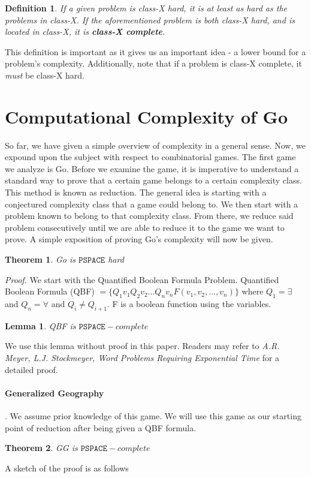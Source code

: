 \documentclass{article}
\newtheorem{theorem}{Theorem}
\newtheorem{lemma}{Lemma}
\newtheorem{definition}{Definition}
\begin{document}
\begin{definition}
If a given problem is class-X hard, it is at least as hard as the problems in class-X.
\newline
If the aforementioned problem is both class-X hard, and is located in class-X, it is \textbf{class-X complete}.
\end{definition}

This definition is important as it gives us an important idea - a lower bound for a problem's complexity. Additionally, note that if a problem is class-X complete, it \emph{must} be class-X hard. 

\section{Computational Complexity of Go}
So far, we have given a simple overview of complexity in a general sense. Now, we expound upon the subject with respect to combinatorial games. 
\newline
\newline
The first game we analyze is Go. Before we examine the game, it is imperative to understand a standard way to prove that a certain game belongs to a certain complexity class. This method is known as reduction. The general idea is starting with a conjectured complexity class that a game could belong to. We then start with a problem known to belong to that complexity class. From there, we reduce said problem consecutively until we are able to reduce it to the game we want to prove. 
\newline
\newline
A simple exposition of proving Go's complexity will now be given.
\begin{theorem}
Go is $\texttt{PSPACE}$ hard
\end{theorem}
\emph{Proof.} We start with the Quantified Boolean Formula Problem. Quantified Boolean Formula (QBF) $ = \{Q_1v_1Q_2v_2...Q_nv_nF(v_1, v_2,..., v_n)\}$ where $Q_1 = \exists$ and $Q_n = \forall$ and $Q_i \neq Q_{i+1}$. F is a boolean function using the variables. 
\begin{lemma}
QBF is $\texttt{PSPACE}-complete$
\end{lemma}
We use this lemma without proof in this paper. Readers may refer to \emph{A.R. Meyer, L.J. Stockmeyer, Word Problems Requiring Exponential Time} for a detailed proof. 
\paragraph{Generalized Geography}.
\newline
\newline
We assume prior knowledge of this game. We will use this game as our starting point of reduction after being given a QBF formula. 
\begin{theorem}
GG is $\texttt{PSPACE}-complete$
\end{theorem}
A sketch of the proof is as follows
\end{document}

